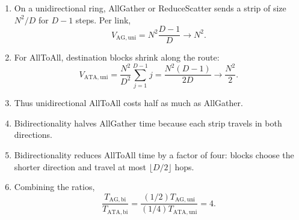\documentclass[11pt]{article}
\begin{document}
\begin{enumerate}[label=(\alph*)]
\item On a unidirectional ring, AllGather or ReduceScatter sends a strip of
size $N^2/D$ for $D-1$ steps. Per link,
\[
V_{\mathrm{AG,uni}}=N^2\frac{D-1}{D}\longrightarrow N^2.
\]

\item For AllToAll, destination blocks shrink along the route:
\[
V_{\mathrm{ATA,uni}}
=\frac{N^2}{D^2}\sum_{j=1}^{D-1}j
=\frac{N^2(D-1)}{2D}
\longrightarrow\frac{N^2}{2}.
\]

\item Thus unidirectional AllToAll costs half as much as AllGather.

\item Bidirectionality halves AllGather time because each strip travels in
both directions.

\item Bidirectionality reduces AllToAll time by a factor of four: blocks choose
the shorter direction and travel at most $\lfloor D/2\rfloor$ hops.

\item Combining the ratios,
\[
\frac{T_{\mathrm{AG,bi}}}{T_{\mathrm{ATA,bi}}}
=\frac{(1/2)T_{\mathrm{AG,uni}}}{(1/4)T_{\mathrm{ATA,uni}}}
=\boxed{4}.
\]
\end{enumerate}
\end{document}
